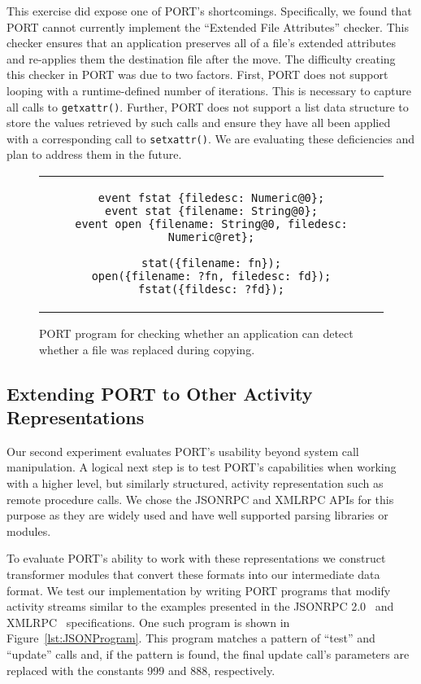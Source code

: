 This exercise did expose one of PORT's shortcomings.  Specifically,
we found that PORT cannot currently implement the ``Extended File
Attributes'' checker.
This checker ensures that an application
preserves all of a file's extended attributes and re-applies them the
destination file after the move.
The difficulty creating this checker
in PORT was due to two factors.
First, PORT does not support looping with a
runtime-defined number of iterations.  This is necessary to capture all
calls to {\tt getxattr()}.
Further, PORT does not support a list data structure to store the values
retrieved by such calls and ensure they have all been applied with a
corresponding call to {\tt setxattr()}.
We are evaluating these deficiencies and plan to address them in the
future.

\begin{figure}
\centering
\begin{tabular}{c}
\begin{lstlisting}
event fstat {filedesc: Numeric@0};
event stat {filename: String@0};
event open {filename: String@0, filedesc: Numeric@ret};

stat({filename: fn});
open({filename: ?fn, filedesc: fd});
fstat({fildesc: ?fd});
\end{lstlisting}
\end{tabular}
\caption{PORT program for checking whether an application can detect whether a file was replaced during copying.}
\label{lst:FileReplacedPORT}
\end{figure}

\subsection{Extending PORT to Other Activity Representations}

Our second experiment evaluates PORT's usability beyond system call manipulation.
A logical next step is to test PORT's capabilities when working
with a higher level, but similarly structured, activity representation such as remote procedure calls.
We chose the JSONRPC and XMLRPC APIs for this purpose as they are widely used and have well
supported parsing libraries or modules.

To evaluate PORT's ability to work with these representations we
construct transformer modules that convert these formats into our
intermediate data format.
We test our implementation by writing PORT programs that modify
activity streams similar to the examples presented in the JSONRPC
2.0~\cite{jsonspec} and XMLRPC~\cite{xmlspec}
specifications.  One such program is shown in
Figure~\ref{lst:JSONProgram}.  This program matches a pattern of ``test''
and ``update'' calls and, if the pattern is found, the final update call's
parameters are replaced with the constants 999 and 888, respectively.

